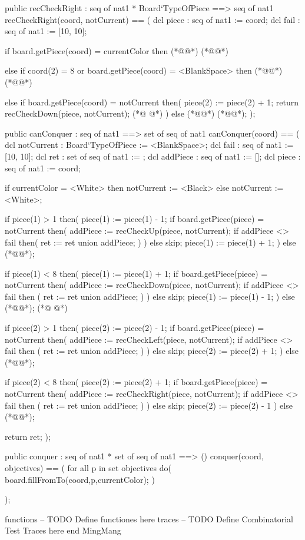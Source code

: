\begin{vdmpp}[breaklines=true]
 public recCheckRight : seq of nat1 * Board`TypeOfPiece ==> seq of nat1
 recCheckRight(coord, notCurrent) ==
 ( 
  dcl piece : seq of nat1 := coord;
  dcl fail : seq of nat1 := [10, 10];
   
  if board.getPiece(coord) = currentColor
  then (*@@*) (*@@*)
  
  else if coord(2) = 8 or board.getPiece(coord) = <BlankSpace>
  then (*@@*) (*@@*)
  
  else if board.getPiece(coord) = notCurrent
  then(
   piece(2) := piece(2) + 1;
   return recCheckDown(piece, notCurrent);
(*@
\label{recCheckRight:179}
@*)
  ) 
  else (*@@*) (*@@*);
 );
 
 
 public canConquer : seq of nat1 ==> set of seq of nat1
 canConquer(coord) ==
 ( 
  dcl notCurrent : Board`TypeOfPiece := <BlankSpace>;
  dcl fail : seq of nat1 := [10, 10];
  dcl ret : set of seq of nat1 := {};
  dcl addPiece : seq of nat1 := [];
  dcl piece : seq of nat1 := coord; 
  
  
  
  if currentColor = <White>
  then notCurrent := <Black>
  else notCurrent := <White>;
  

  if piece(1) > 1
  then(
   piece(1) := piece(1) - 1;
   if board.getPiece(piece) = notCurrent
   then( 
    addPiece := recCheckUp(piece, notCurrent);
    if addPiece <> fail
    then(
     ret := ret union {addPiece};
     )
   )
   else skip;
   piece(1) := piece(1) + 1;
  )
  else
   (*@@*);
   
  if piece(1) < 8
  then(
   piece(1) := piece(1) + 1;
   if board.getPiece(piece) = notCurrent
   then(
    addPiece := recCheckDown(piece, notCurrent);
    if addPiece <> fail
    then (
     ret := ret union {addPiece};
     )
   )
   else skip;
   piece(1) := piece(1) - 1;
  )
  else (*@@*);
(*@
\label{conquer:232}
@*)
  
  if piece(2) > 1
  then(
   piece(2) := piece(2) - 1;
   if board.getPiece(piece) = notCurrent
   then(
    addPiece := recCheckLeft(piece, notCurrent);
    if addPiece <> fail
    then (
     ret := ret union {addPiece};
     )
   )
   else skip;
   piece(2) := piece(2) + 1;
  ) 
  else (*@@*); 
  
  if piece(2) < 8
  then(
   piece(2) := piece(2) + 1;
   if board.getPiece(piece) = notCurrent
   then(
    addPiece := recCheckRight(piece, notCurrent);
    if addPiece <> fail
    then (
     ret := ret union {addPiece};
     )
   )
   else skip;
   piece(2) := piece(2) - 1
  )
  else (*@@*);
 
 return ret;
 );
 
 
 public conquer : seq of nat1 * set of seq of nat1 ==> ()
 conquer(coord, objectives) ==
 (
  for all p in set objectives do(
   board.fillFromTo(coord,p,currentColor);
   )
  
 );

functions
-- TODO Define functiones here
traces
-- TODO Define Combinatorial Test Traces here
end MingMang
\end{vdmpp}

